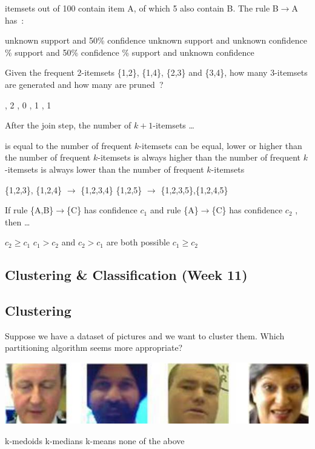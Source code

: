 \documentclass[12pt,a4paper,answers]{exam} %
\begin{document}
\begin{flushleft}
\begin{multicols*}{2}
\begin{questions}
 itemsets out of 100 contain item A, of which 5 also contain B. The rule B$\rightarrow$A has~:
\begin{checkboxes}
\choice unknown support and 50\% confidence
\choice unknown support and unknown confidence
\% support and 50\% confidence
\% support and unknown confidence
\end{checkboxes}

\question Given the frequent 2-itemsets \{1,2\}, \{1,4\}, \{2,3\} and \{3,4\}, how many 3-itemsets are generated and how many are pruned~?
\begin{checkboxes}
, 2
, 0
, 1
, 1
\end{checkboxes}

\question After the join step, the number of $k+1$-itemsets \ldots
\begin{checkboxes}
\choice is equal to the number of frequent $k$-itemsets
\CorrectChoice can be equal, lower or higher than the number of frequent $k$-itemsets
\choice is always higher than the number of frequent $k$-itemsets
\choice is always lower than the number of frequent $k$-itemsets
\end{checkboxes}
\begin{solution}
\{1,2,3\}, \{1,2,4\} $\rightarrow$ \{1,2,3,4\}
\{1,2,5\} $\rightarrow$ \{1,2,3,5\},\{1,2,4,5\}
\end{solution}

\question If rule \{A,B\}$\rightarrow$\{C\} has confidence $c_1$ and rule \{A\}$\rightarrow$\{C\} has confidence $c_2$ , then \ldots
\begin{checkboxes}
\CorrectChoice $c_2 \geq c_1$
\choice $c_1 > c_2$ and $c_2 > c_1$ are both possible
\choice $c_1 \geq c_2$
\end{checkboxes}


\subsection{Clustering \& Classification (Week 11)}
\subsection{Clustering}
\question Suppose we have a dataset of pictures and we want to cluster them. Which partitioning algorithm seems more appropriate?
\begin{colfig}
\includegraphics[scale=0.3]{w11_s13}
\end{colfig}
\begin{checkboxes}
\choice k-medoids
\choice k-medians
\choice k-means
\CorrectChoice none of the above
\end{checkboxes}


\end{questions}
\end{multicols*}
\end{flushleft}
\end{document}
